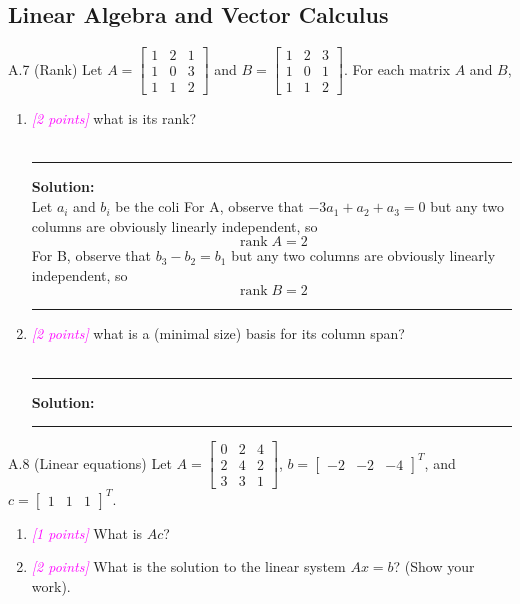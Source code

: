 \documentclass{article}
\newcommand{\1}{\mathbf{1}}
\DeclareMathOperator{\rank}{rank}
\newcommand{\points}[1]{\small\textcolor{magenta}{\emph{[#1 points]}} \normalsize}
\begin{document}
\subsection*{Linear Algebra and Vector Calculus}
A.7 (Rank) Let $A = \begin{bmatrix} 1 & 2 & 1 \\ 1 & 0 & 3 \\ 1 & 1 & 2 \end{bmatrix}$ and $B = \begin{bmatrix} 1 & 2 & 3 \\ 1 & 0 & 1 \\ 1 & 1 & 2 \end{bmatrix}$.
For each matrix $A$ and $B$,
\begin{enumerate} 
	\item \points{2} what is its rank?\\
\\
    \noindent\rule{\textwidth}{1pt}
    {\bf Solution:}\\
    Let $a_i$ and $b_i$ be the coli
    For A, observe that $-3a_1 + a_2 + a_3 = 0$ but any two columns are obviously linearly independent, so 
    $$
    \boxed{\rank{A} = 2}
    $$
    For B, observe that $b_3 - b_2 = b_1$ but any two columns are obviously linearly independent, so 
    $$
    \boxed{\rank{B} = 2}
    $$
    \noindent\rule{\textwidth}{1pt}
	\item \points{2} what is a (minimal size) basis for its column span?\\
\\
    \noindent\rule{\textwidth}{1pt}
    {\bf Solution:}\\


    \noindent\rule{\textwidth}{1pt}
\end{enumerate}

A.8 (Linear equations) Let $A = \begin{bmatrix} 0 & 2 & 4 \\ 2 & 4 & 2 \\ 3 & 3 & 1 \end{bmatrix}$, $b = \begin{bmatrix} -2 & -2 & -4 \end{bmatrix}^T$, and $c=\begin{bmatrix} 1 & 1 & 1 \end{bmatrix}^T$.
\begin{enumerate}
	\item \points{1} What is $Ac$?
	\item \points{2} What is the solution to the linear system $Ax = b$? (Show your work).
\end{enumerate}
\end{document}
